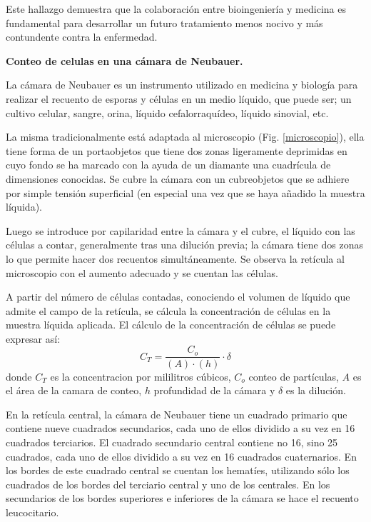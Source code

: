 Este hallazgo demuestra que la colaboración entre bioingeniería y medicina es fundamental para desarrollar un futuro tratamiento menos nocivo y más contundente contra la enfermedad.

\textbf{Conteo de celulas en una cámara de Neubauer.}

La cámara de Neubauer es un instrumento utilizado en medicina y biología para realizar el recuento de esporas y células en un medio líquido, que puede ser; un cultivo celular, sangre, orina, líquido cefalorraquídeo, líquido sinovial, etc.

La misma tradicionalmente está adaptada al microscopio (Fig. \ref{microscopio}), ella tiene forma de un portaobjetos que tiene dos zonas ligeramente deprimidas en cuyo fondo se ha marcado con la ayuda de un diamante una cuadrícula de dimensiones conocidas. Se cubre la cámara con un cubreobjetos que se adhiere por simple tensión superficial (en especial una vez que se haya añadido la muestra líquida).

Luego se introduce por capilaridad entre la cámara y el cubre, el líquido con las células a contar, generalmente tras una dilución previa; la cámara tiene dos zonas lo que permite hacer dos recuentos simultáneamente. Se observa la retícula al microscopio con el aumento adecuado y se cuentan las células.

A partir del número de células contadas, conociendo el volumen de líquido que admite el campo de la retícula, se cálcula la concentración de células en la muestra líquida aplicada. El cálculo de la concentración de células se puede expresar así:
\begin{equation}
    \label{concentracion}
    C_T = \dfrac{C_o}{(A)\cdot (h) }\cdot \delta
\end{equation}
donde $C_T$ es la concentracion por mililitros cúbicos, $C_o$ conteo de partículas, $A$ es el área de la camara de conteo, $h$ profundidad de la cámara y $\delta$ es la dilución.

En la retícula central, la cámara de Neubauer tiene un cuadrado primario que contiene nueve cuadrados secundarios, cada uno de ellos dividido a su vez en 16 cuadrados terciarios. El cuadrado secundario central contiene no 16, sino 25 cuadrados, cada uno de ellos dividido a su vez en 16 cuadrados cuaternarios. En los bordes de este cuadrado central se cuentan los hematíes, utilizando sólo los cuadrados de los bordes del terciario central y uno de los centrales. En los secundarios de los bordes superiores e inferiores de la cámara se hace el recuento leucocitario.


